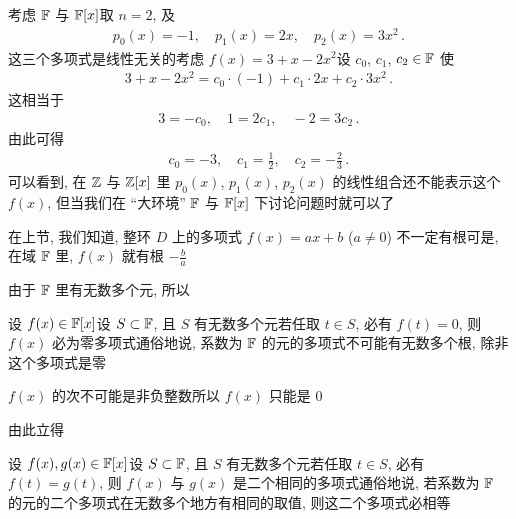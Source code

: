 \begin{example}
    考虑 $\mathbb{F}$ 与 $\mathbb{F}[x]$\period 取 $n=2$, 及
    \begin{align*}
        p_0 (x) = -1, \quad p_1 (x) = 2x, \quad p_2 (x) = 3x^2 \period
    \end{align*}
    这三个多项式是线性无关的\period 考虑 $f(x) = 3 + x - 2x^2$\period 设 $c_0$, $c_1$, $c_2 \in \mathbb{F}$ 使
    \begin{align*}
        3 + x - 2x^2 = c_0 \cdot (-1) + c_1 \cdot 2x + c_2 \cdot 3x^2 \period
    \end{align*}
    这相当于
    \begin{align*}
        3 = -c_0, \quad 1 = 2c_1, \quad -2 = 3c_2 \period
    \end{align*}
    由此可得
    \begin{align*}
        c_0 = -3, \quad c_1 = \frac12, \quad c_2 = -\frac23 \period
    \end{align*}
    可以看到, 在 $\mathbb{Z}$ 与 $\mathbb{Z}[x]$ 里 $p_0 (x)$, $p_1 (x)$, $p_2 (x)$ 的线性组合还不能表示这个 $f(x)$, 但当我们在 ``大环境'' $\mathbb{F}$ 与 $\mathbb{F}[x]$ 下讨论问题时就可以了\period
\end{example}

\begin{remark}
    在上节, 我们知道, 整环 $D$ 上的多项式 $f(x) = ax + b$ ($a \neq 0$) 不一定有根\period 可是, 在域 $\mathbb{F}$ 里, $f(x)$ 就有根 $-\frac{b}{a}$\period
\end{remark}

由于 $\mathbb{F}$ 里有无数多个元, 所以

\begin{proposition}
    设 $f(x) \in \mathbb{F}[x]$\period 设 $S \subset \mathbb{F}$, 且 $S$ 有无数多个元\period 若任取 $t \in S$, 必有 $f(t) = 0$, 则 $f(x)$ 必为零多项式\period 通俗地说, 系数为 $\mathbb{F}$ 的元的多项式不可能有无数多个根, 除非这个多项式是零\period
\end{proposition}

\begin{pf}
    $f(x)$ 的次不可能是非负整数\period 所以 $f(x)$ 只能是 $0$\period
\end{pf}

由此立得

\begin{proposition}
    设 $f(x),g(x) \in \mathbb{F}[x]$\period 设 $S \subset \mathbb{F}$, 且 $S$ 有无数多个元\period 若任取 $t \in S$, 必有 $f(t) = g(t)$, 则 $f(x)$ 与 $g(x)$ 是二个相同的多项式\period 通俗地说, 若系数为 $\mathbb{F}$ 的元的二个多项式在无数多个地方有相同的取值, 则这二个多项式必相等\period
\end{proposition}

